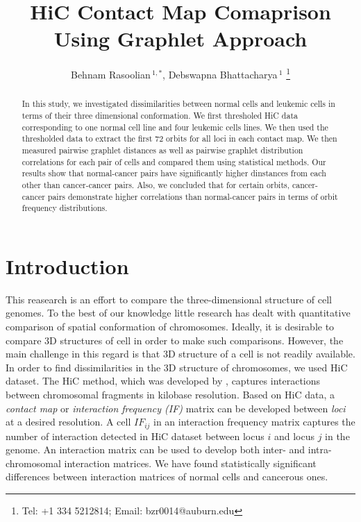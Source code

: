 \documentclass[a4,center,fleqn]{NAR}
\begin{document}
\title{HiC Contact Map Comaprison Using Graphlet Approach}

\author{%
    Behnam Rasoolian\,$^{1,*}$,
    Debswapna Bhattacharya\,$^{1}$
    \footnote{
    Tel: +1 334 5212814; Email: bzr0014@auburn.edu}}

    \address{%
        $^{1}$ Auburn University
        }


            \maketitle

\begin{abstract}

In this study, we investigated
dissimilarities between normal cells and leukemic cells
in terms of their three dimensional conformation.
We first thresholed HiC data corresponding to
one normal cell line and four leukemic cells lines.
We then used the thresholded data to extract the 
first 72 orbits for all loci in each contact map.
We then measured pairwise graphlet distances as
well as pairwise graphlet distribution correlations
for each pair of cells and compared them using 
statistical methods.
Our results show that normal-cancer pairs have
significantly higher dinstances from each other
than cancer-cancer pairs.
Also, we concluded that for certain orbits,
cancer-cancer pairs demonstrate higher correlations
than normal-cancer pairs in terms of orbit frequency
distributions.

\end{abstract}

\section{Introduction}
This reasearch is an effort to compare the three-dimensional
structure of cell genomes. To the best of our knowledge
little research has dealt with quantitative comparison
of spatial conformation of chromosomes.
Ideally, it is desirable to compare 3D structures of 
cell in order to make such comparisons.
However, the main challenge in this regard
is that 
3D structure of a cell is not readily available. 
In order to find dissimilarities in the 3D structure of 
chromosomes, we used HiC dataset.
The HiC method, which was developed by 
\cite{lieberman2009comprehensive}, captures interactions between 
chromosomal fragments in kilobase resolution. 
Based on HiC data, a \textit{contact map} or
\textit{interaction frequency (IF) } matrix can be developed 
between \textit{loci} at a desired resolution.
A cell $IF_{ij}$ in an interaction frequency matrix captures 
the number of interaction detected
in HiC dataset between locus $i$ and locus $j$ in the genome.
An interaction matrix can be used to develop both 
inter- and intra-chromosomal interaction matrices.
We have found statistically significant
differences between interaction matrices of
normal cells and cancerous ones.
\end{document}
